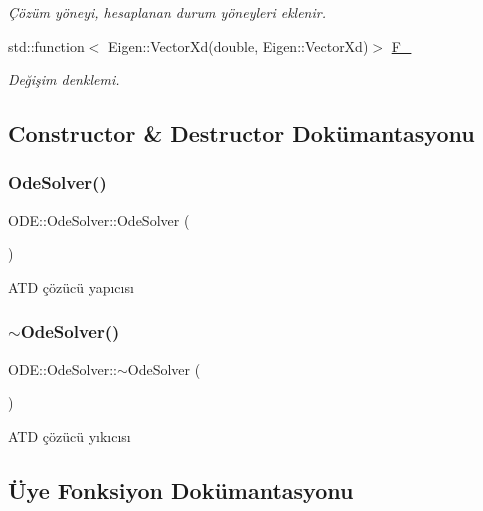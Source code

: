 \begin{DoxyCompactItemize}
\begin{DoxyCompactList}\small\item\em Çözüm yöneyi, hesaplanan durum yöneyleri eklenir. \end{DoxyCompactList}\item 
std\+::function$<$ Eigen\+::\+Vector\+Xd(double, Eigen\+::\+Vector\+Xd)$>$ \mbox{\hyperlink{classODE_1_1OdeSolver_a806b1ad1f9109867796a035423227831}{F\+\_\+}}
\begin{DoxyCompactList}\small\item\em Değişim denklemi. \end{DoxyCompactList}\end{DoxyCompactItemize}


\subsection{Constructor \& Destructor Dokümantasyonu}
\mbox{\label{classODE_1_1OdeSolver_a8a1e1a4d7d4eec40090e95a40f0da601}} 
\subsubsection{\texorpdfstring{OdeSolver()}{OdeSolver()}}
{\footnotesize\ttfamily O\+D\+E\+::\+Ode\+Solver\+::\+Ode\+Solver (\begin{DoxyParamCaption}{ }\end{DoxyParamCaption})}

A\+TD çözücü yapıcısı \mbox{\label{classODE_1_1OdeSolver_a40eb1af84fe4849368b7957f33eee14c}} 
\subsubsection{\texorpdfstring{$\sim$OdeSolver()}{~OdeSolver()}}
{\footnotesize\ttfamily O\+D\+E\+::\+Ode\+Solver\+::$\sim$\+Ode\+Solver (\begin{DoxyParamCaption}{ }\end{DoxyParamCaption})\hspace{0.3cm}{\ttfamily [virtual]}}

A\+TD çözücü yıkıcısı 

\subsection{Üye Fonksiyon Dokümantasyonu}
\mbox{\label{classODE_1_1OdeSolver_adc59b7ead56779e625138f334229b370}} 
